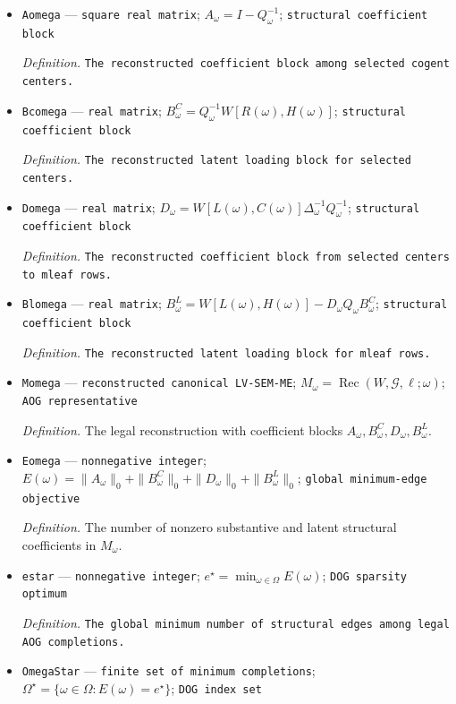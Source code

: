\documentclass{article}
\begin{document}
\begin{itemize}
  \item \texttt{Aomega} --- \texttt{square real matrix}; \(A_{\omega}=I-Q_{\omega}^{-1}\); \texttt{structural coefficient block}
  \par\smallskip\noindent\emph{Definition.} \texttt{The reconstructed coefficient block among selected cogent centers.}
  \item \texttt{Bcomega} --- \texttt{real matrix}; \(B^{C}_{\omega}=Q_{\omega}^{-1}W[R(\omega),H(\omega)]\); \texttt{structural coefficient block}
  \par\smallskip\noindent\emph{Definition.} \texttt{The reconstructed latent loading block for selected centers.}
  \item \texttt{Domega} --- \texttt{real matrix}; \(D_{\omega}=W[L(\omega),C(\omega)]\Delta_{\omega}^{-1}Q_{\omega}^{-1}\); \texttt{structural coefficient block}
  \par\smallskip\noindent\emph{Definition.} \texttt{The reconstructed coefficient block from selected centers to mleaf rows.}
  \item \texttt{Blomega} --- \texttt{real matrix}; \(B^{L}_{\omega}=W[L(\omega),H(\omega)]-D_{\omega}Q_{\omega}B^{C}_{\omega}\); \texttt{structural coefficient block}
  \par\smallskip\noindent\emph{Definition.} \texttt{The reconstructed latent loading block for mleaf rows.}
  \item \texttt{Momega} --- \texttt{reconstructed canonical LV-\allowbreak{}SEM-\allowbreak{}ME}; \(M_{\omega}=\operatorname{Rec}(W,\mathcal G,\ell;\omega)\); \texttt{AOG representative}
  \par\smallskip\noindent\emph{Definition.} The legal reconstruction with coefficient blocks \(A_{\omega},B^{C}_{\omega},D_{\omega},B^{L}_{\omega}\).
  \item \texttt{Eomega} --- \texttt{nonnegative integer}; \(E(\omega)=\|A_{\omega}\|_0+\|B^{C}_{\omega}\|_0+\|D_{\omega}\|_0+\|B^{L}_{\omega}\|_0\); \texttt{global minimum-\allowbreak{}edge objective}
  \par\smallskip\noindent\emph{Definition.} The number of nonzero substantive and latent structural coefficients in \(M_{\omega}\).
  \item \texttt{estar} --- \texttt{nonnegative integer}; \(e^{\star}=\min_{\omega\in\Omega}E(\omega)\); \texttt{DOG sparsity optimum}
  \par\smallskip\noindent\emph{Definition.} \texttt{The global minimum number of structural edges among legal AOG completions.}
  \item \texttt{OmegaStar} --- \texttt{finite set of minimum completions}; \(\Omega^{\star}=\{\omega\in\Omega:E(\omega)=e^{\star}\}\); \texttt{DOG index set}

\end{itemize}
\end{document}
